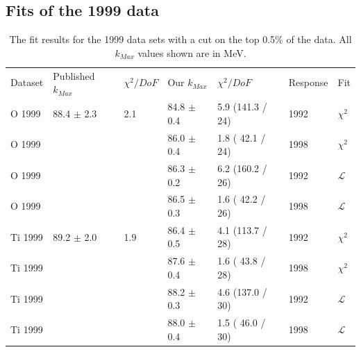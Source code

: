 \subsection { Fits of the 1999 data }

\begin{table}[h]
  \begin{center}
    \begin{tabular}{|l||l|l|l|l|l|l|}
      \hline
      Dataset & Published $k_{Max}$ & $\chi^2 / DoF$ & Our $k_{Max}$ & $\chi^2 / DoF$  & Response & Fit \\
      \hhline{|=||=|=|=|=|=|=|}

      O  1999 & 88.4 $\pm$ 2.3 & 2.1 & 84.8 $\pm$ 0.4 & 5.9 (141.3 / 24) & 1992 & $\chi^2$ \\
      O  1999 &                &     & 86.0 $\pm$ 0.4 & 1.8 ( 42.1 / 24) & 1998 & $\chi^2$ \\
      O  1999 &                &     & 86.3 $\pm$ 0.2 & 6.2 (160.2 / 26) & 1992 & $\mathcal{L}$ \\
      O  1999 &                &     & 86.5 $\pm$ 0.3 & 1.6 ( 42.2 / 26) & 1998 & $\mathcal{L}$ \\
      \hline                           
      Ti 1999 & 89.2 $\pm$ 2.0 & 1.9 & 86.4 $\pm$ 0.5 & 4.1 (113.7 / 28) & 1992 & $\chi^2$ \\
      Ti 1999 &                &     & 87.6 $\pm$ 0.4 & 1.6 ( 43.8 / 28) & 1998 & $\chi^2$ \\
      Ti 1999 &                &     & 88.2 $\pm$ 0.3 & 4.6 (137.0 / 30) & 1992 & $\mathcal{L}$ \\
      Ti 1999 &                &     & 88.0 $\pm$ 0.4 & 1.5 ( 46.0 / 30) & 1998 & $\mathcal{L}$ \\
      \hline                           
    \end{tabular}
  \end{center}
  \caption{The fit results for the 1999 data sets with a cut on the top 0.5\% of the data. All $k_{Max}$ values shown are in MeV.}
  \label{table:fits1999}
\end{table}


